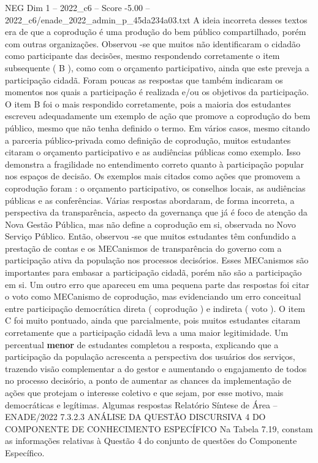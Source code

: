 \begin{textsample}{NEG Dim 1 – 2022\_c6 – Score -5.00 – 2022\_c6/enade\_2022\_admin\_p\_45da234a03.txt}
A ideia incorreta desses textos era de que a coprodução é uma produção do bem público compartilhado, porém com outras organizações.
Observou -se que muitos não identificaram o cidadão como participante das decisões, mesmo respondendo corretamente o item subsequente ( B ), como com o orçamento participativo, ainda que este preveja a participação cidadã.
Foram poucas as respostas que também indicaram os momentos nos quais a participação é realizada e/ou os objetivos da participação.
O item B foi o mais respondido corretamente, pois a maioria dos estudantes escreveu adequadamente um exemplo de ação que promove a coprodução do bem público, mesmo que não tenha definido o termo.
Em vários casos, mesmo citando a parceria público-privada como definição de coprodução, muitos estudantes citaram o orçamento participativo e as audiências públicas como exemplo.
Isso demonstra a fragilidade no entendimento correto quanto à participação popular nos espaços de decisão.
Os exemplos mais citados como ações que promovem a coprodução foram : o orçamento participativo, os conselhos locais, as audiências públicas e as conferências.
Várias respostas abordaram, de forma incorreta, a perspectiva da transparência, aspecto da governança que já é foco de atenção da Nova Gestão Pública, mas não define a coprodução em si, observada no Novo Serviço Público.
Então, observou -se que muitos estudantes têm confundido a prestação de contas e os MECanismos de transparência do governo com a participação ativa da população nos processos decisórios.
Esses MECanismos são importantes para embasar a participação cidadã, porém não são a participação em si.
Um outro erro que apareceu em uma pequena parte das respostas foi citar o voto como MECanismo de coprodução, mas evidenciando um erro conceitual entre participação democrática direta ( coprodução ) e indireta ( voto ).
O item C foi muito pontuado, ainda que parcialmente, pois muitos estudantes citaram corretamente que a participação cidadã leva a uma maior legitimidade.
Um percentual \textbf{menor} de estudantes completou a resposta, explicando que a participação da população acrescenta a perspectiva dos usuários dos serviços, trazendo visão complementar a do gestor e aumentando o engajamento de todos no processo decisório, a ponto de aumentar as chances da implementação de ações que protejam o interesse coletivo e que sejam, por esse motivo, mais democráticas e legítimas.
Algumas respostas Relatório Síntese de Área – ENADE/2022 7.3.2.3 ANÁLISE DA QUESTÃO DISCURSIVA 4 DO COMPONENTE DE CONHECIMENTO ESPECÍFICO Na Tabela 7.19, constam as informações relativas à Questão 4 do conjunto de questões do Componente Específico.

\end{textsample}
